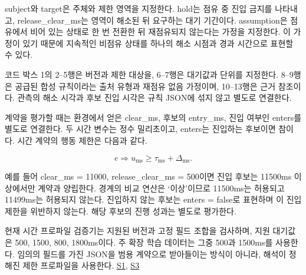\documentclass[10pt,a4paper,twocolumn]{article}\usepackage[margin=18mm]{geometry}\usepackage{fontspec,kotex}
\begin{document}
{\ttfamily{}\selectfont\footnotesize subject}와 {\ttfamily{}\selectfont\footnotesize target}은 주체와 제한 영역을 지정한다. {\ttfamily{}\selectfont\footnotesize hold}는 점유 중 진입 금지를 나타내고, {\ttfamily{}\selectfont\footnotesize release\_\allowbreak clear\_\allowbreak ms}는 영역이 해소된 뒤 요구하는 대기 기간이다. {\ttfamily{}\selectfont\footnotesize assumption}은 점유에서 비어 있는 상태로 한 번 전환한 뒤 재점유되지 않는다는 가정을 지정한다. 이 가정이 있기 때문에 지속적인 비점유 상태를 하나의 해소 시점과 경과 시간으로 표현할 수 있다.\par

코드 박스 1의 2--5행은 버전과 제한 대상을, 6--7행은 대기값과 단위를 지정한다. 8--9행은 공급된 합성 규칙이라는 출처 유형과 재점유 없음 가정이며, 10--13행은 근거 참조이다. 관측의 해소 시각과 후보 진입 시각은 규칙 JSON에 섞지 않고 별도로 연결한다.\par

계약을 평가할 때는 환경에서 얻은 {\ttfamily{}\selectfont\footnotesize clear\_\allowbreak ms}, 후보의 {\ttfamily{}\selectfont\footnotesize entry\_\allowbreak ms}, 진입 여부인 {\ttfamily{}\selectfont\footnotesize enters}를 별도로 연결한다. 두 시간 변수는 정수 밀리초이고, {\ttfamily{}\selectfont\footnotesize enters}는 진입하는 후보이면 참이다. 시간 계약의 행동 제한은 다음과 같다.\par

\[e\Rightarrow u_{\mathrm{ms}}\geq\tau_{\mathrm{ms}}+\Delta_{\mathrm{ms}}.\]

예를 들어 {\ttfamily{}\selectfont\footnotesize clear\_\allowbreak ms = 11000}, {\ttfamily{}\selectfont\footnotesize release\_\allowbreak clear\_\allowbreak ms = 500}이면 진입 후보는 11500ms 이상에서만 계약과 양립한다. 경계의 비교 연산은 ‘이상’이므로 11500ms는 허용되고 11499ms는 허용되지 않는다. 진입하지 않는 후보는 {\ttfamily{}\selectfont\footnotesize enters = false}로 표현하며 이 진입 제한을 위반하지 않는다. 해당 후보의 진행 성과는 별도로 평가한다.\par

현재 시간 프로파일 검증기는 지원된 버전과 고정 필드 조합을 검사하며, 지원 대기값은 500, 1500, 800, 1800ms이다. 주 확장 학습 데이터는 그중 500과 1500ms를 사용한다. 임의의 필드를 가진 JSON을 범용 계약으로 받아들이는 방식이 아니라, 해석이 정해진 제한 프로파일을 사용한다. \href{\detokenize{projects/04-guardsynth-coc/experiments/paper1_cnl_learning/temporal_preservation.py}}{S1}, \href{\detokenize{projects/04-guardsynth-coc/experiments/paper1_cnl_learning/temporal_training_data.py}}{S3}\par
\end{document}
